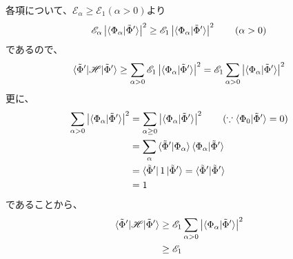 各項について、$\mathscr{E}_{\alpha}\geq\mathscr{E}_{1}(\alpha>0)$より
\begin{align}
	\mathscr{E}_{\alpha}
		\left|\braket{\Phi_{\alpha}|\tilde{\Phi}'}\right|^2
\geq
	\mathscr{E}_{1}
		\left|\braket{\Phi_{\alpha}|\tilde{\Phi}'}\right|^2
	\qquad
	(\alpha>0)
\end{align}
であるので、
\begin{align}
	\braket{\tilde{\Phi}'|\mathscr{H}|\tilde{\Phi}'}
\geq
	\sum_{\alpha>0}
		\mathscr{E}_{1}
			\left|
				\braket{\Phi_{\alpha}|\tilde{\Phi}'}
			\right|^2
=
	\mathscr{E}_{1}
		\sum_{\alpha>0}
			\left|
				\braket{\Phi_{\alpha}|\tilde{\Phi}'}
			\right|^2
\end{align}
更に、
\begin{align}
	\sum_{\alpha>0}
		\left|
			\braket{\Phi_{\alpha}|\tilde{\Phi}'}
		\right|^2
&=
	\sum_{\alpha\geq 0}
		\left|
			\braket{\Phi_{\alpha}|\tilde{\Phi}'}
		\right|^2
	\qquad
	(\because\braket{\Phi_{0}|\tilde{\Phi}'}=0) \\
%
%
&=
	\sum_{\alpha}
		\braket{\tilde{\Phi}'|\Phi_{\alpha}}
			\braket{\Phi_{\alpha}|\tilde{\Phi}'} \\
%
%
&=
	\bra{\tilde{\Phi}'} 1 \ket{\tilde{\Phi}'}
=
	\braket{\tilde{\Phi}'|\tilde{\Phi}'} \\
%
%
&=
	1
\end{align}
であることから、
\begin{align}
	\braket{\tilde{\Phi}'|\mathscr{H}|\tilde{\Phi}'}
&\geq
	\mathscr{E}_1
		\sum_{\alpha>0}
			\left|
				\braket{\Phi_{\alpha}|\tilde{\Phi}'}
			\right|^2 \\
%
%
&\geq
	\mathscr{E}_1
\end{align}
